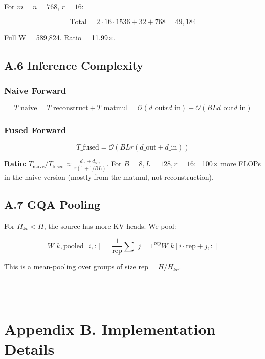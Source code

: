 For $m = n = 768$, $r = 16$:

\[
\text{Total} = 2 \cdot 16 \cdot 1536 + 32 + 768 = 49,184
\tag{A.4}
\]

Full W = 589,824. Ratio = 11.99$\times$.

\subsection{A.6 Inference Complexity}

\subsubsection{Naive Forward}

\[
T\_\text{naive} = T\_\text{reconstruct} + T\_\text{matmul} = \mathcal{O}(d\_\text{out} r d\_\text{in}) + \mathcal{O}(BL d\_\text{out} d\_\text{in})
\tag{A.5}
\]

\subsubsection{Fused Forward}

\[
T\_\text{fused} = \mathcal{O}(BL r (d\_\text{out} + d\_\text{in}))
\tag{A.6}
\]

\textbf{Ratio:} $T_\text{naive} / T_\text{fused} \approx \frac{d_\text{in} + d_\text{out}}{r (1 + 1/BL)}$. 
For $B = 8, L = 128, r = 16$: ~100$\times$ more FLOPs in the naive version (mostly 
from the matmul, not reconstruction).

\subsection{A.7 GQA Pooling}

For $H_{kv} < H$, the source has more KV heads. We pool:

\[
W\_{k,\text{pooled}}[i, :] = \frac{1}{\text{rep}} \sum\_{j=1}^{\text{rep}} W\_{k}[i \cdot \text{rep} + j, :]
\tag{A.7}
\]

This is a mean-pooling over groups of size $\text{rep} = H / H_{kv}$.
\begin{lstlisting}

---
\end{lstlisting}


\section{Appendix B. Implementation Details}

